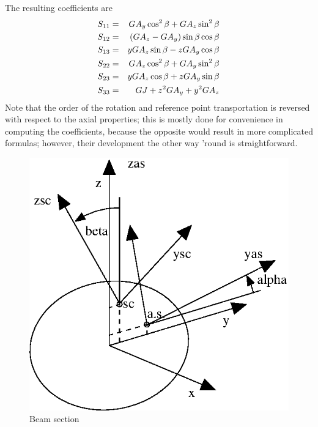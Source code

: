 The resulting coefficients are
\begin{eqnarray*}
	S_{11} & = & GA_y \cos^2\beta + GA_z \sin^2\beta \\
	S_{12} & = & \left( GA_z - GA_y \right) \sin\beta\cos\beta \\
	S_{13} & = & y GA_z \sin\beta - z GA_y \cos\beta \\
	S_{22} & = & GA_z \cos^2\beta + GA_y \sin^2\beta \\
	S_{23} & = & y GA_z \cos\beta + z GA_y \sin\beta \\
	S_{33} & = & GJ + z^2 GA_y + y^2 GA_z
\end{eqnarray*}
Note that the order of the rotation and reference point transportation 
is reversed with respect to the axial properties; this is mostly done
for convenience in computing the coefficients, because the opposite
would result in more complicated formulas; however, their development
the other way 'round is straightforward.

\begin{figure}
\centering
{}
\includegraphics[width=.7\textwidth]{beamsect}
\caption{Beam section}
\label{fig:EL:BEAM:SECTION}
\end{figure}






